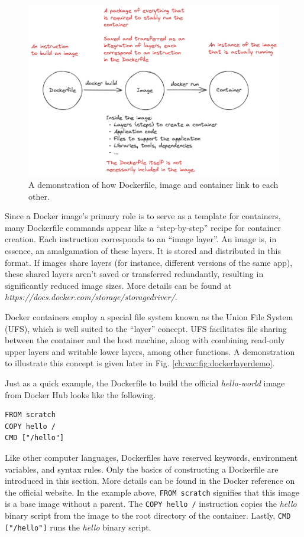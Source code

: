 \begin{figure}[htbp]
	\centering
	\includegraphics[width=350pt]{chapters/ch-virtualization-and-containerization/figures/dockerfiletoimage.png}
	\caption{A demonstration of how Dockerfile, image and container link to each other.} \label{ch:vac:fig:dockerfiletoimage}
\end{figure}

Since a Docker image's primary role is to serve as a template for containers, many Dockerfile commands appear like a ``step-by-step'' recipe for container creation. Each instruction corresponds to an ``image layer''. An image is, in essence, an amalgamation of these layers. It is stored and distributed in this format. If images share layers (for instance, different versions of the same app), these shared layers aren't saved or transferred redundantly, resulting in significantly reduced image sizes. More details can be found at \textit{https://docs.docker.com/storage/storagedriver/}.

Docker containers employ a special file system known as the Union File System (UFS), which is well suited to the ``layer'' concept. UFS facilitates file sharing between the container and the host machine, along with combining read-only upper layers and writable lower layers, among other functions. A demonstration to illustrate this concept is given later in Fig. \ref{ch:vac:fig:dockerlayerdemo}.

Just as a quick example, the Dockerfile to build the official \textit{hello-world} image from Docker Hub looks like the following.
\begin{lstlisting}
FROM scratch
COPY hello /
CMD ["/hello"]
\end{lstlisting}
Like other computer languages, Dockerfiles have reserved keywords, environment variables, and syntax rules. Only the basics of constructing a Dockerfile are introduced in this section. More details can be found in the Docker reference on the official website. In the example above, \verb|FROM scratch| signifies that this image is a base image without a parent. The \verb|COPY hello /| instruction copies the \textit{hello} binary script from the image to the root directory of the container. Lastly, \verb|CMD ["/hello"]| runs the \textit{hello} binary script.

